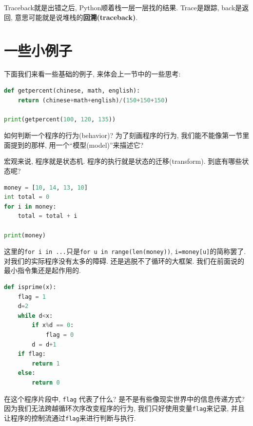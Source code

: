 Traceback就是出错之后, Python顺着栈一层一层找的结果. Trace是跟踪, back是返回, 意思可能就是说堆栈的\textbf{回溯(traceback)}.





\section{一些小例子}

下面我们来看一些基础的例子, 来体会上一节中的一些思考: 


\begin{lstlisting}[language=Python]
def getpercent(chinese, math, english): 
    return (chinese+math+english)/(150+150+150)

print(getpercent(100, 120, 135))
\end{lstlisting}

\begin{bonus}
如何判断一个程序的行为(behavior)? 为了刻画程序的行为, 我们能不能像第一节里面提到的那样, 用一个``模型(model)''来描述它?

宏观来说, 程序就是状态机. 程序的执行就是状态的迁移(transform). 到底有哪些状态呢?
\end{bonus}


\begin{lstlisting}[language=Python]
money = [10, 14, 13, 10]
int total = 0
for i in money: 
    total = total + i

print(money)
\end{lstlisting}

这里的\texttt{for i in ...}只是\texttt{for u in range(len(money))}, \texttt{i=money[u]}的简称罢了. 对我们的实际程序没有太多的障碍. 还是逃脱不了循环的大框架. 我们在前面说的最小指令集还是起作用的. 


\begin{lstlisting}[language=Python]
def isprime(x): 
    flag = 1 
    d=2
    while d<x:
        if x%d == 0: 
            flag = 0
        d = d+1
    if flag: 
        return 1
    else: 
        return 0
\end{lstlisting}

在这个程序片段中, \texttt{flag} 代表了什么? 是不是有些像现实世界中的信息传递方式? 因为我们无法跨越循环次序改变程序的行为, 我们只好使用变量\texttt{flag}来记录, 并且让程序的控制流通过\texttt{flag}来进行判断与执行. 

